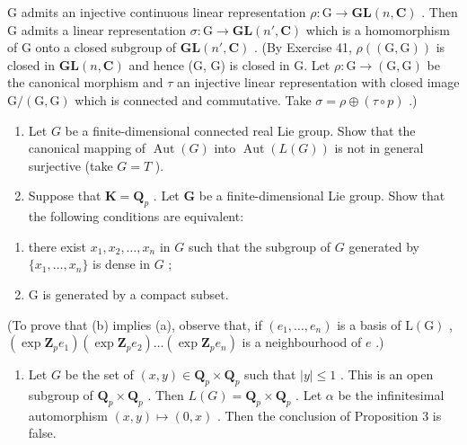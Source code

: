 G admits an injective continuous linear representation \(\rho: \mathrm{G} \to \mathbf{GL}(n, \mathbf{C})\) . Then G admits a linear representation \(\sigma: \mathrm{G} \to \mathbf{GL}(n', \mathbf{C})\) which is a homomorphism of G onto a closed subgroup of \(\mathbf{GL}(n', \mathbf{C})\) . (By Exercise 41, \(\rho((\mathrm{G}, \mathrm{G}))\) is closed in \(\mathbf{GL}(n, \mathbf{C})\) and hence (G, G) is closed in G. Let \(\rho: \mathrm{G} \to (\mathrm{G}, \mathrm{G})\) be the canonical morphism and \(\tau\) an injective linear representation with closed image \(\mathrm{G}/(\mathrm{G}, \mathrm{G})\) which is connected and commutative. Take \(\sigma = \rho \oplus (\tau \circ p)\) .)


\begin{enumerate}
\def\labelenumi{\arabic{enumi}.}
\item
  Let \(G\) be a finite-dimensional connected real Lie group. Show that the canonical mapping of \(\operatorname{Aut}(G)\) into \(\operatorname{Aut}(L(G))\) is not in general surjective (take \(G = T\) ).
\item
  Suppose that \(\mathbf{K} = \mathbf{Q}_p\) . Let \(\mathbf{G}\) be a finite-dimensional Lie group. Show that the following conditions are equivalent:
\end{enumerate}

\begin{enumerate}
\def\labelenumi{(\alph{enumi})}
\item
  there exist \(x_{1}, x_{2}, \ldots, x_{n}\) in \(G\) such that the subgroup of \(G\) generated by \(\{x_{1}, \ldots, x_{n}\}\) is dense in \(G\) ;
\item
  G is generated by a compact subset.
\end{enumerate}

(To prove that (b) implies (a), observe that, if \((e_1, \ldots, e_n)\) is a basis of \(\mathrm{L}(\mathrm{G})\) , \((\exp \mathbf{Z}_p e_1)(\exp \mathbf{Z}_p e_2) \ldots (\exp \mathbf{Z}_p e_n)\) is a neighbourhood of \(e\) .)

\begin{enumerate}
\def\labelenumi{\arabic{enumi}.}
\setcounter{enumi}{2}
\tightlist
\item
  Let \(G\) be the set of \((x, y) \in \mathbf{Q}_p \times \mathbf{Q}_p\) such that \(|y| \leqslant 1\) . This is an open subgroup of \(\mathbf{Q}_p \times \mathbf{Q}_p\) . Then \(L(G) = \mathbf{Q}_p \times \mathbf{Q}_p\) . Let \(\alpha\) be the infinitesimal automorphism \((x, y) \mapsto (0, x)\) . Then the conclusion of Proposition 3 is false.
\end{enumerate}


